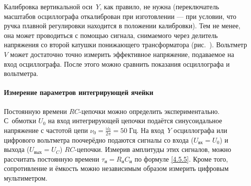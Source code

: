 Калибровка вертикальной оси~$Y$, как правило, не нужна
(переключатель масштабов осциллографа откалиброван при изготовлении ---
при условии, что ручка плавной регулировки находится в положении
калибровки). Тем не менее, она может проводиться с помощью сигнала,
снимаемого через делитель напряжения со второй катушки понижающего трансформатора
(рис.~). Вольтметр $V$ может достаточно точно
измерить эффективное напряжение, подаваемое на вход осциллографа. После
этого можно сравнить показания осциллографа и вольтметра.

\paragraph{Измерение параметров интегрирующей ячейки}
Постоянную времени $RC$-цепочки можно определить экспериментально.
С~обмотки $U_0$ на вход интегрирующей цепочки подаётся синусоидальное напряжение
с частотой цепи $\nu_0=\frac{\omega_0}{2\pi}=50\;Гц$.
На вход~$Y$ осциллографа или цифрового вольтметра поочерёдно
подаются сигналы со входа ($U_\text{вх}=U_0$) и выхода ($U_\text{вых} = U_C$)
$RC$-цепочки. Измерив амплитуды этих сигналов, можно рассчитать постоянную
времени $\tau_{и}= R_{и}C_{и}$ по формуле \eqref{4.5.5}.
Кроме того, сопротивление и ёмкость можно независимым образом измерить
цифровым мультиметром.

